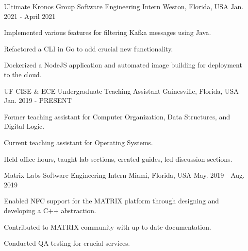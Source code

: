 \begin{cventries}
  \cventry
    {Ultimate Kronos Group} %
    {Software Engineering Intern} %
    {Weston, Florida, USA} %
    {Jan. 2021 - April 2021} %
    {
      \begin{cvitems} %
        \item {Implemented various features for filtering Kafka messages using Java.}
        \item {Refactored a CLI in Go to add crucial new functionality.}
        \item {Dockerized a NodeJS application and automated image building for deployment to the cloud.}
      \end{cvitems}
    }


  \cventry
    {UF CISE \& ECE} %
    {Undergraduate Teaching Assistant} %
    {Gainesville, Florida, USA} %
    {Jan. 2019 - PRESENT} %
    {
      \begin{cvitems} %
        \item {Former teaching assistant for Computer Organization, Data Structures, and Digital Logic.}
        \item {Current teaching assistant for Operating Systems.}
        \item {Held office hours, taught lab sections, created guides, led discussion sections.}
      \end{cvitems}
    }


  \cventry
    {Matrix Labs} %
    {Software Engineering Intern} %
    {Miami, Florida, USA} %
    {May. 2019 - Aug. 2019} %
    {
      \begin{cvitems} %
        \item {Enabled NFC support for the MATRIX platform through designing and developing a C++ abstraction.}
        \item {Contributed to MATRIX community with up to date documentation.}
        \item {Conducted QA testing for crucial services.}
      \end{cvitems}
    }


\end{cventries}

